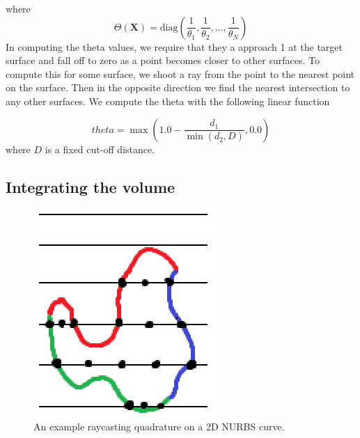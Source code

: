 where
\begin{equation}
     \Theta(\mathbf{X}) = \text{diag}\left( \frac{1}{\theta_1},\frac{1}{\theta_2},\dots,\frac{1}{\theta_N}\right)
\end{equation}
In computing the theta values, we require that they a approach 1 at the target surface and fall off to zero as a point becomes closer to other surfaces. To compute this for some surface, we shoot a ray from the point to the nearest point on the surface.  Then in the opposite direction we find the nearest intersection to any other surfaces. We compute the theta with the following linear function 

\begin{equation}
theta = \max (1.0 - \frac{d_1}{\min (d_2, D)}, 0.0)
\end{equation}
where $D$ is a fixed cut-off distance.


\subsection{Integrating the volume}
\begin{figure}[h]
  \centering
  \includegraphics[width=\linewidth]{figures/raycasting_quadrature}
  \caption{An example raycasting quadrature on a 2D NURBS curve.}
\end{figure}